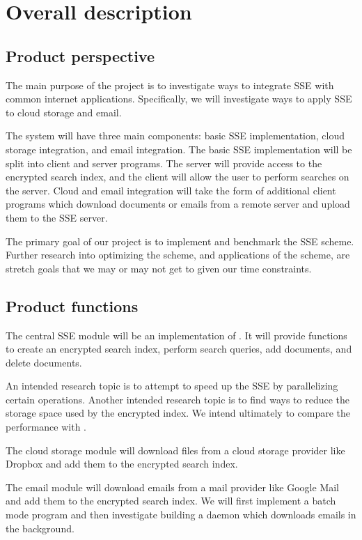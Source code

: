 \section{ Overall description }
\subsection{ Product perspective }

The main purpose of the project is to investigate ways to integrate SSE with common internet applications.
Specifically, we will investigate ways to apply SSE to cloud storage and email.

The system will have three main components: basic SSE implementation, cloud storage integration, and email integration. The basic SSE implementation will be split into client and server programs. The server will provide access to the encrypted search index, and the client will allow the user to perform searches on the server. Cloud and email integration will take the form of additional client programs which download documents or emails from a remote server and upload them to the SSE server.

The primary goal of our project is to implement and benchmark the SSE scheme.
Further research into optimizing the scheme, and applications of the scheme, are stretch goals that we may or may not get to given our time constraints.

\subsection{ Product functions }

The central SSE module will be an implementation of \cite{cash14}. It will provide functions to create an encrypted search index, perform search queries, add documents, and delete documents.

An intended research topic is to attempt to speed up the SSE by parallelizing certain operations.
Another intended research topic is to find ways to reduce the storage space used by the encrypted index.
We intend ultimately to compare the performance with \cite{yavuz15}.

The cloud storage module will download files from a cloud storage provider like Dropbox and add them to the encrypted search index.

The email module will download emails from a mail provider like Google Mail and add them to the encrypted search index. We will first implement a batch mode program and then investigate building a daemon which downloads emails in the background.


